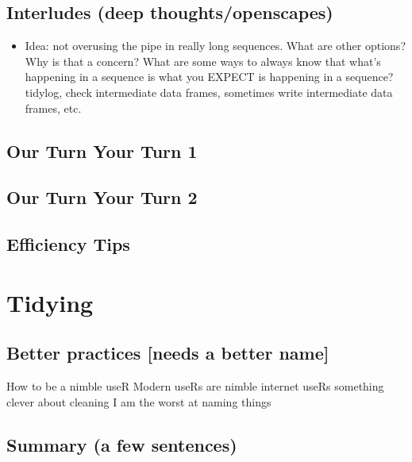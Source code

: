 \documentclass[]{book}
\providecommand{\tightlist}{%
  \setlength{\itemsep}{0pt}\setlength{\parskip}{0pt}}
\begin{document}
\hypertarget{interludes-deep-thoughtsopenscapes-3}{%
\section{Interludes (deep thoughts/openscapes)}\label{interludes-deep-thoughtsopenscapes-3}}

\begin{itemize}
\tightlist
\item
  Idea: not overusing the pipe in really long sequences. What are other options? Why is that a concern? What are some ways to always know that what's happening in a sequence is what you EXPECT is happening in a sequence? tidylog, check intermediate data frames, sometimes write intermediate data frames, etc.
\end{itemize}

\hypertarget{our-turn-your-turn-1}{%
\section{Our Turn Your Turn 1}\label{our-turn-your-turn-1}}

\hypertarget{our-turn-your-turn-2}{%
\section{Our Turn Your Turn 2}\label{our-turn-your-turn-2}}

\hypertarget{efficiency-tips-4}{%
\section{Efficiency Tips}\label{efficiency-tips-4}}

\hypertarget{tidying}{%
\chapter{Tidying}\label{tidying}}

\hypertarget{better-practices-needs-a-better-name}{%
\section{Better practices {[}needs a better name{]}}\label{better-practices-needs-a-better-name}}

How to be a nimble useR
Modern useRs are nimble internet useRs
something clever about cleaning
I am the worst at naming things

\hypertarget{summary-a-few-sentences-3}{%
\section{Summary (a few sentences)}\label{summary-a-few-sentences-3}}
\end{document}

